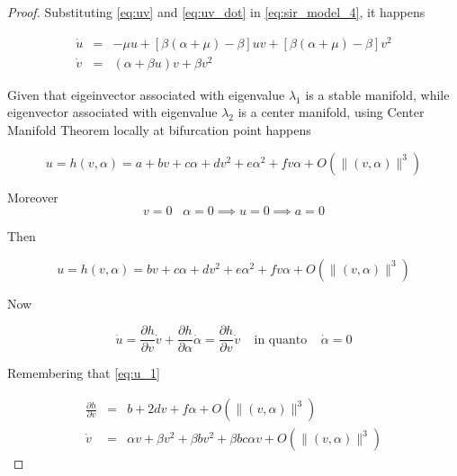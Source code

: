\begin{proof}
Substituting \ref{eq:uv} and \ref{eq:uv_dot} in \ref{eq:sir_model_4}, it happens

\begin{equation}
    \label{eq:sir_model_5}
    \begin{array}{ccc}
        \dot{u} &=& -\mu u + \left[ \beta(\alpha+\mu)-\beta \right]uv + \left[ \beta(\alpha + \mu) -\beta \right]v^2 \\
        \dot{v} &=& (\alpha + \beta u)v + \beta v^2
    \end{array}
\end{equation}

Given that eigeinvector associated with eigenvalue $\lambda_1$ is a stable manifold, while eigenvector associated with eigenvalue $\lambda_2$ is a center manifold, using Center Manifold Theorem \cite[pp. 303]{bib:khalil} locally at bifurcation point happens

\begin{equation}
    u = h(v,\alpha) = a+bv+c\alpha+dv^2+e\alpha^2+fv\alpha+O\left(\|(v,\alpha)\|^3\right)
\end{equation}

Moreover
\begin{equation}
    v = 0 \;\;\; \alpha = 0 \implies u = 0 \implies a = 0
\end{equation}

Then

\begin{equation}
    \label{eq:u_1}
    u = h(v,\alpha) = bv+c\alpha+dv^2+e\alpha^2+fv\alpha+O\left(\|(v,\alpha)\|^3\right)
\end{equation}

Now

\begin{equation}
    \label{eq:dotu_1}
    \dot{u} = \frac{\partial h}{\partial v}\dot{v} + \frac{\partial h}{\partial \alpha}\dot{\alpha} = \frac{\partial h}{\partial v}\dot{v} \;\;\;\; \text{in quanto} \;\;\;\; \dot{\alpha} = 0
\end{equation}

Remembering that \ref{eq:u_1}

\begin{equation}
    \begin{array}{ccc}
        \frac{\partial h}{\partial v} &=& b + 2dv+f\alpha+O\left(\|(v,\alpha)\|^3\right) \\
        \dot{v} &=& \alpha v + \beta v^2 + \beta b v^2 + \beta bc \alpha v + O\left(\|(v,\alpha)\|^3\right)
    \end{array}
\end{equation}


\end{proof}
